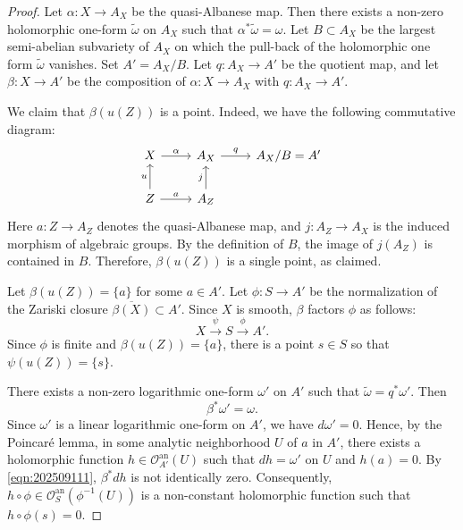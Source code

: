 \documentclass[11pt,english]{smfart}
\theoremstyle{plain}
\theoremstyle{definition}
\theoremstyle{remark}
\numberwithin{equation}{section}
\theoremstyle{plain}
\begin{document}
\begin{proof}
Let $\alpha:X \to A_X$ be the quasi-Albanese map.
Then there exists a non-zero holomorphic one-form $\tilde{\omega}$ on $A_X$ such that $\alpha^*\tilde{\omega}=\omega$.
Let $B \subset A_X$ be the largest semi-abelian subvariety of $A_X$ on which the pull-back of the holomorphic one form $\tilde{\omega}$ vanishes.
Set $A' = A_X / B$.
Let $q:A_X \to A'$ be the quotient map, and let $\beta:X \to A'$ be the composition of $\alpha:X \to A_X$ with $q:A_X \to A'$.




We claim that $\beta(u(Z))$ is a point.
Indeed, we have the following commutative diagram:
	\[
		\begin{tikzcd}
			X \arrow[r, "\alpha"] & A_{X} \arrow[r, "q"] & A_X/B=A' \\
			Z \arrow[u, "u"] \arrow[r, "a"] & A_{Z} \arrow[u, "j"]
		\end{tikzcd}
	\]
	Here $a:Z \to A_{Z}$ denotes the quasi-Albanese map, and $j:A_{Z} \to A_X$ is the induced morphism of algebraic groups.
By the definition of $B$, the image of $j(A_{Z})$ is contained in $B$.
Therefore, $\beta(u(Z))$ is a single point, as claimed.






Let $\beta(u(Z))=\{a\}$ for some $a\in A'$.
Let $\phi:S\to A'$ be the normalization of the Zariski closure $\overline{\beta(X)}\subset A'$.
Since $X$ is smooth, $\beta$ factors $\phi$ as follows:
	\[
	X\stackrel{\psi}{\to} S\stackrel{\phi}{\to} A'.
	\]
	Since $\phi$ is finite and $\beta(u(Z))=\{a\}$, there is a point $s\in S$ so that $\psi(u(Z))=\{s\}$. 
	
	
	There exists a non-zero logarithmic one-form $\omega'$ on $A'$ such that $\widetilde{\omega} = q^*\omega'$.
Then
\begin{equation}\label{eqn:202509111} 
\beta^*\omega' = \omega. 
\end{equation} 
Since $\omega'$ is a linear logarithmic one-form on $A'$, we have $d\omega' = 0$.
Hence, by the Poincaré lemma, in some analytic neighborhood $U$ of $a$ in $A'$, there exists a holomorphic function $h \in \mathcal{O}_{A'}^{\mathrm{an}}(U)$ such that $dh = \omega'$ on $U$ and $h(a) = 0$.
By \eqref{eqn:202509111}, $\beta^*dh$ is not identically zero.
Consequently, $h \circ \phi\in \mathcal{O}^{\mathrm{an}}_S(\phi^{-1}(U))$ is a non-constant holomorphic function such that $h\circ\phi(s)=0$.

	
	
	
	

\end{proof}
\end{document}
